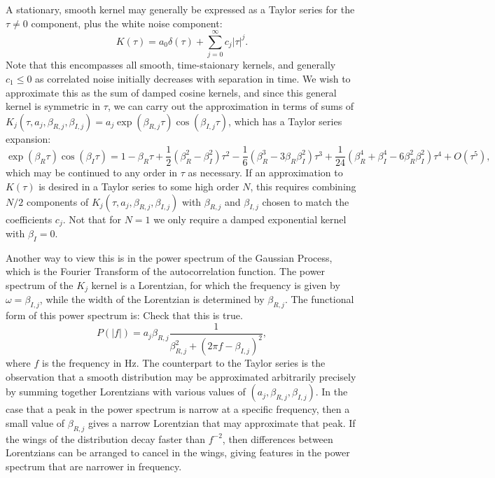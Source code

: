 \documentclass[manuscript, letterpaper]{aastex6}
\makeatletter
\let\origsection\section
\renewcommand\section{\@ifstar{\starsection}{\nostarsection}}
\newcommand\nostarsection[1]{\sectionprelude\origsection{#1}}
\newcommand\starsection[1]{\sectionprelude\origsection*{#1}}
\newcommand\sectionprelude{\vspace{1em}}
\makeatother
\begin{document}
\section{Kernel components}

A stationary, smooth kernel may generally be expressed as a Taylor series for the $\tau \ne 0$ component,
plus the white noise component:
\begin{equation}
K(\tau) = a_0 \delta(\tau) +  \sum_{j=0}^\infty c_j \vert\tau\vert^j.
\end{equation}
Note that this encompasses all smooth, time-staionary kernels, and generally $c_1 \le 0$ as
correlated noise initially decreases with separation in time.  We wish to approximate this
as the sum of damped cosine kernels, and since this general kernel is symmetric in $\tau$, we
can carry out the approximation in terms of sums of $K_j(\tau,a_j,\beta_{R,j},\beta_{I,j}) = a_j \exp{(\beta_{R,j} \tau)}\cos{(\beta_{I,j} \tau)}$,
which has a Taylor series expansion:
\begin{equation}
\exp{(\beta_R \tau)}\cos{(\beta_I \tau)} = 1 - \beta_R \tau + \frac{1}{2}\left(\beta_R^2 - \beta_I^2\right)\tau^2 -
\frac{1}{6} \left(\beta_R^3-3\beta_R\beta_I^2\right)\tau^3 + \frac{1}{24} \left(\beta_R^4+\beta_I^4-6\beta_R^2\beta_I^2\right) \tau^4+ O(\tau^5),
\end{equation}
which may be continued to any order in $\tau$ as necessary.
If an approximation to $K(\tau)$ is desired in a Taylor series to some high order $N$, this
requires combining $N/2$ components of $K_j(\tau,a_j,\beta_{R,j},\beta_{I,j})$ with $\beta_{R,j}$ and $\beta_{I,j}$
chosen to match the coefficients $c_j$.  Not that for $N=1$ we only require a damped exponential
kernel with $\beta_I = 0$.

Another way to view this is in the power spectrum of the Gaussian Process, which is the
Fourier Transform of the autocorrelation function.  The power spectrum of the $K_j$ kernel
is a Lorentzian, for which the frequency is given by $\omega = \beta_{I,j}$, while the
width of the Lorentzian is determined by $\beta_{R,j}$.  The functional form of this
power spectrum is: {\color{red} Check that this is true.}
\begin{equation}
P(\vert f\vert) = a_j \beta_{R,j} \frac{1}{\beta_{R,j}^2 + (2\pi f - \beta_{I,j})^2},
\end{equation}
where $f$ is the frequency in Hz.  The counterpart to the Taylor series is the observation
that a smooth distribution may be approximated arbitrarily precisely by summing together
Lorentzians with various values of $(a_j,\beta_{R,j},\beta_{I,j})$.  In the case that
a peak in the power spectrum is narrow at a specific frequency, then a small value of 
$\beta_{R,j}$ gives a narrow Lorentzian that may approximate that peak.  If the wings
of the distribution decay faster than $f^{-2}$, then differences between Lorentzians
can be arranged to cancel in the wings, giving features in the power spectrum that are
narrower in frequency.
\end{document}
